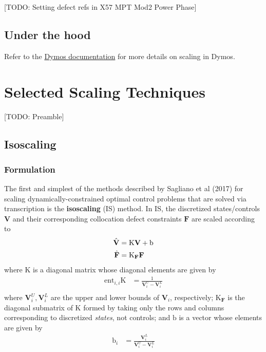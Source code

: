 \documentclass{article}
\begin{document}
[TODO: Setting defect refs in X57 MPT Mod2 Power Phase]

\subsection*{Under the hood}

Refer to the \href{https://openmdao.github.io/dymos/index.html}{Dymos documentation} for more details on scaling in Dymos.

\newpage
\section{Selected Scaling Techniques}

[TODO: Preamble]

\subsection*{Isoscaling}

\subsubsection*{Formulation}

The first and simplest of the methods described by Sagliano et al (2017) for scaling dynamically-constrained optimal control problems that are solved via transcription is the \textbf{isoscaling} (IS) method. In IS, the discretized states/controls $\textbf{V}$ and their corresponding collocation defect constraints $\textbf{F}$ are scaled according to
\begin{align*}
    \Hat{\textbf{V}} &= \text{K} \textbf{V} + \text{b} \\
    \Hat{\textbf{F}} &= \text{K}_\textbf{F} \textbf{F}
\end{align*}
where $\text{K}$ is a diagonal matrix whose diagonal elements are given by
\begin{align*}
    \text{ent}_{i,i} \text{K} &= \frac{1}{\textbf{V}_i^U - \textbf{V}_i^L} \\
\end{align*}
where $\textbf{V}_i^U, \textbf{V}_i^L$ are the upper and lower bounds of $\textbf{V}_i$, respectively; $\text{K}_\textbf{F}$ is the diagonal submatrix of $\text{K}$ formed by taking only the rows and columns corresponding to discretized \textit{states}, not controls; and $\text{b}$ is a vector whose elements are given by
\begin{align*}
    \text{b}_i &= \frac{\textbf{V}_i^L}{\textbf{V}_i^U - \textbf{V}_i^L}
\end{align*}
\end{document}
